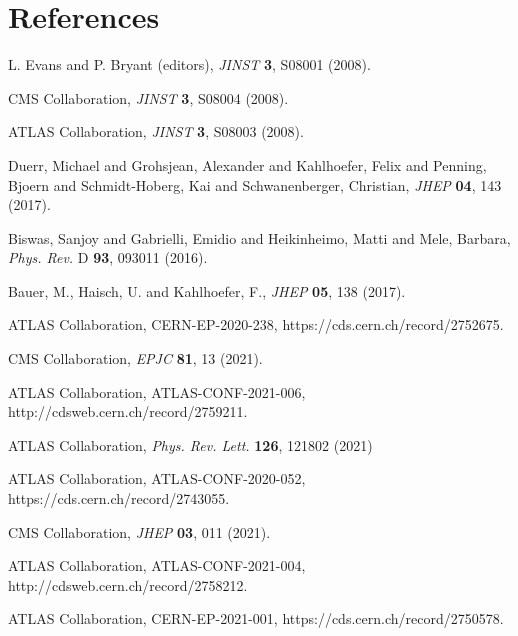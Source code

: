 \documentclass{moriond}
\def\Journal#1#2#3#4{{#1} {\bf #2}, #3 (#4)}
\def\PRL{\em Phys. Rev. Lett.}
\def\PRD{{\em Phys. Rev.} D}
\def\JINST{\em JINST}
\def\JHEP{\em JHEP}
\def\EPJC{\em EPJC}
\begin{document}
\section*{References}

\begin{thebibliography}{99}

L. Evans and P. Bryant (editors), \Journal{\JINST}{3}{S08001}{2008}.

CMS Collaboration, \Journal{\JINST}{3}{S08004}{2008}.

ATLAS Collaboration, \Journal{\JINST}{3}{S08003}{2008}.

Duerr, Michael and Grohsjean, Alexander and Kahlhoefer, Felix and Penning, Bjoern and Schmidt-Hoberg, Kai and Schwanenberger, Christian, \Journal{\JHEP}{04}{143}{2017}.

Biswas, Sanjoy and Gabrielli, Emidio and Heikinheimo, Matti and Mele, Barbara, \Journal{\PRD}{93}{093011}{2016}.

Bauer, M., Haisch, U. and Kahlhoefer, F., \Journal{\JHEP}{05}{138}{2017}.

ATLAS Collaboration, CERN-EP-2020-238, https://cds.cern.ch/record/2752675.

CMS Collaboration, \Journal{\EPJC}{81}{13}{2021}.

ATLAS Collaboration, ATLAS-CONF-2021-006, http://cdsweb.cern.ch/record/2759211. 

ATLAS Collaboration, \Journal{\PRL}{126}{121802}{2021} 

ATLAS Collaboration, ATLAS-CONF-2020-052, https://cds.cern.ch/record/2743055.

CMS Collaboration, \Journal{\JHEP}{03}{011}{2021}.

ATLAS Collaboration, ATLAS-CONF-2021-004, http://cdsweb.cern.ch/record/2758212.

ATLAS Collaboration, CERN-EP-2021-001, https://cds.cern.ch/record/2750578.

\end{thebibliography}
\end{document}
